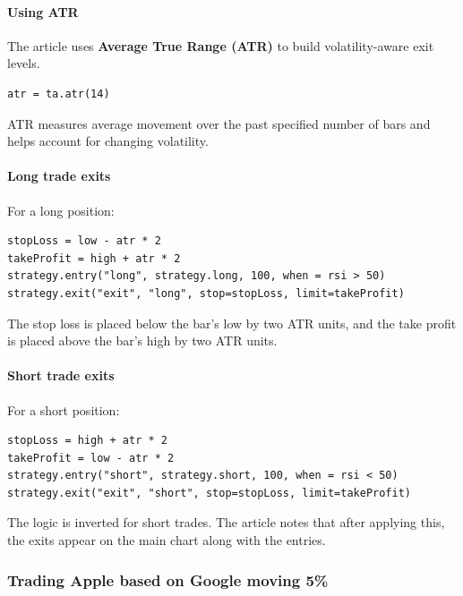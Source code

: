\documentclass[12pt,openany]{book}
\begin{document}
\paragraph{Using ATR}

The article uses \textbf{Average True Range (ATR)} to build volatility-aware exit levels.

\begin{Verbatim}[breaklines=true,breakanywhere=true,fontsize=\small]
atr = ta.atr(14)
\end{Verbatim}

ATR measures average movement over the past specified number of bars and helps account for changing volatility.

\paragraph{Long trade exits}

For a long position:

\begin{Verbatim}[breaklines=true,breakanywhere=true,fontsize=\small]
stopLoss = low - atr * 2
takeProfit = high + atr * 2
strategy.entry("long", strategy.long, 100, when = rsi > 50)
strategy.exit("exit", "long", stop=stopLoss, limit=takeProfit)
\end{Verbatim}

The stop loss is placed below the bar's low by two ATR units, and the take profit is placed above the bar's high by two ATR units.

\paragraph{Short trade exits}

For a short position:

\begin{Verbatim}[breaklines=true,breakanywhere=true,fontsize=\small]
stopLoss = high + atr * 2
takeProfit = low - atr * 2
strategy.entry("short", strategy.short, 100, when = rsi < 50)
strategy.exit("exit", "short", stop=stopLoss, limit=takeProfit)
\end{Verbatim}

The logic is inverted for short trades. The article notes that after applying this, the exits appear on the main chart along with the entries.

\subsubsection{Trading Apple based on Google moving 5\%}
\end{document}
